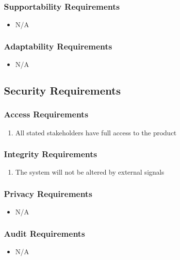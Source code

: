 \documentclass [11pt]{article}
\begin{document}
\subsubsection{Supportability Requirements }
	\begin{itemize}
		\item N/A
	\end{itemize}

\subsubsection{Adaptability Requirements}
	\begin{itemize}
		\item N/A
	\end{itemize}

\subsection{Security Requirements }
\subsubsection{Access Requirements }
	\begin{enumerate}[label=\textbf{\Alph*}:]
		\item All stated stakeholders have full access to the product
	\end{enumerate}

\subsubsection{Integrity Requirements }
	\begin{enumerate}[label=\textbf{\Alph*}:]
		\item The system will not be altered by external signals
	\end{enumerate}

\subsubsection{Privacy Requirements }
	\begin{itemize}
		\item N/A
	\end{itemize}

\subsubsection{Audit  Requirements }
	\begin{itemize}
		\item N/A
	\end{itemize} 
\end{document}
